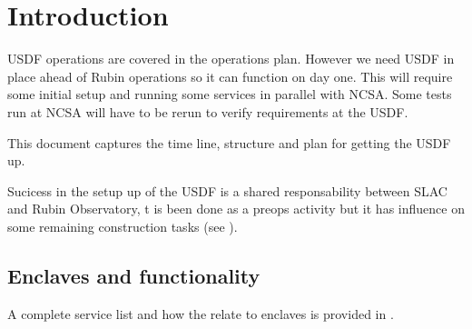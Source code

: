 \section{Introduction}
USDF operations are covered in the operations plan.
However we need USDF in place ahead of Rubin  operations so it can function on day one.
This will require some initial setup and running some services in parallel with NCSA.
Some tests  run at NCSA will have to be rerun to verify requirements at the USDF.

This document captures the time line, structure and plan for getting the USDF up.

Sucicess in the setup up of the USDF is a shared responsability between SLAC and Rubin Observatory,
t is been done as a preops activity but it has influence on some remaining construction tasks (see ).

\subsection{Enclaves and functionality}\label{sec:enclaves}

A complete service list  and how the relate to enclaves is provided in .
